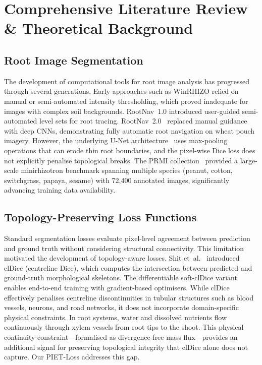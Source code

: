 \documentclass[final,3p,times,nonatbib]{elsarticle}
\begin{document}
\section{Comprehensive Literature Review \& Theoretical Background}
\label{sec:lit_rev}

\subsection{Root Image Segmentation}
The development of computational tools for root image analysis has progressed through several generations. Early approaches such as WinRHIZO relied on manual or semi-automated intensity thresholding, which proved inadequate for images with complex soil backgrounds. RootNav~1.0 introduced user-guided semi-automated level sets for root tracing. RootNav~2.0~\cite{rootnav2019} replaced manual guidance with deep CNNs, demonstrating fully automatic root navigation on wheat pouch imagery. However, the underlying U-Net architecture~\cite{ronneberger2015unet} uses max-pooling operations that can erode thin root boundaries, and the pixel-wise Dice loss does not explicitly penalise topological breaks. The PRMI collection~\cite{prmi2022} provided a large-scale minirhizotron benchmark spanning multiple species (peanut, cotton, switchgrass, papaya, sesame) with 72,400 annotated images, significantly advancing training data availability.

\subsection{Topology-Preserving Loss Functions}
Standard segmentation losses evaluate pixel-level agreement between prediction and ground truth without considering structural connectivity. This limitation motivated the development of topology-aware losses. Shit et~al.~\cite{shit2021cldice} introduced clDice (centreline Dice), which computes the intersection between predicted and ground-truth morphological skeletons. The differentiable soft-clDice variant enables end-to-end training with gradient-based optimisers. While clDice effectively penalises centreline discontinuities in tubular structures such as blood vessels, neurons, and road networks, it does not incorporate domain-specific physical constraints. In root systems, water and dissolved nutrients flow continuously through xylem vessels from root tips to the shoot. This physical continuity constraint---formalised as divergence-free mass flux---provides an additional signal for preserving topological integrity that clDice alone does not capture. Our PIET-Loss addresses this gap.
\end{document}
